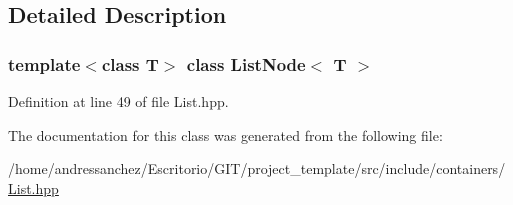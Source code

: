 \subsection{Detailed Description}
\subsubsection*{template$<$class T$>$\newline
class List\+Node$<$ T $>$}



Definition at line 49 of file List.\+hpp.



The documentation for this class was generated from the following file\+:\begin{DoxyCompactItemize}
\item 
/home/andressanchez/\+Escritorio/\+G\+I\+T/project\+\_\+template/src/include/containers/\hyperlink{List_8hpp}{List.\+hpp}\end{DoxyCompactItemize}
